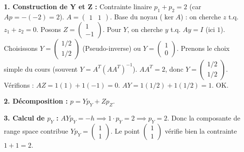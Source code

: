 \begin{correction}
\textbf{1. Construction de Y et Z :}
Contrainte linaire $p_1 + p_2 = 2$ (car $Ap = -(-2) = 2$).
$A = \begin{pmatrix} 1 & 1 \end{pmatrix}$. Base du noyau ($\ker A$) : on cherche $z$ t.q. $z_1 + z_2 = 0$.
Posons $Z = \begin{pmatrix} 1 \\ -1 \end{pmatrix}$.
Pour $Y$, on cherche $y$ t.q. $Ay = I$ (ici $1$). Choisissons $Y = \begin{pmatrix} 1/2 \\ 1/2 \end{pmatrix}$ (Pseudo-inverse) ou $Y = \begin{pmatrix} 1 \\ 0 \end{pmatrix}$.
Prenons le choix simple du cours (souvent $Y = A^T (AA^T)^{-1}$). $AA^T = 2$, donc $Y = \begin{pmatrix} 1/2 \\ 1/2 \end{pmatrix}$.
Vérifions : $A Z = 1(1) + 1(-1) = 0$. $A Y = 1(1/2) + 1(1/2) = 1$. OK.

\textbf{2. Décomposition :} $p = Y p_Y + Z p_Z$.

\textbf{3. Calcul de $p_Y$ :}
$AY p_Y = -h \implies 1 \cdot p_Y = 2 \implies p_Y = 2$.
Donc la composante de range space contribue $Y p_Y = \begin{pmatrix} 1 \\ 1 \end{pmatrix}$.
Le point $\begin{pmatrix} 1 \\ 1 \end{pmatrix}$ vérifie bien la contrainte $1+1=2$.


\end{correction}
